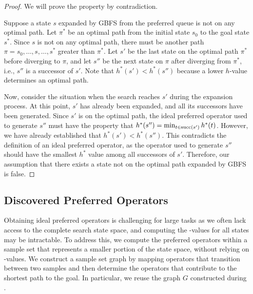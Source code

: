\documentclass[ppgc,diss,english]{iiufrgs}
\begin{document}
\begin{proof}
We will prove the property by contradiction.

Suppose a state $s$ expanded by GBFS from the preferred queue is not on any optimal path.
Let $\pi^*$ be an optimal path from the initial state $s_0$ to the goal state $s^*$. Since $s$ is not on any optimal path, there must be another path $\pi = s_0,\ldots,s,\ldots,s^*$ greater than $\pi^*$.
Let $s'$ be the last state on the optimal path $\pi^*$ before diverging to $\pi$, and let $s''$ be the next state on $\pi$ after diverging from $\pi^*$, i.e., $s''$ is a successor of $s'$. Note that $h^*(s') < h^*(s'')$ because a lower $h$-value determines an optimal path.

Now, consider the situation when the search reaches $s'$ during the expansion process. At this point, $s'$ has already been expanded, and all its successors have been generated. Since $s'$ is on the optimal path, the ideal preferred operator used to generate $s''$ must have the property that $h^*(s'') = \min_{t \in \operatorname{succ}(s')} h^*{(t)}$. However, we have already established that $h^*(s') < h^*(s'')$. This contradicts the definition of an ideal preferred operator, as the operator used to generate $s''$ should have the smallest $h^*$ value among all successors of $s'$. Therefore, our assumption that there exists a state not on the optimal path expanded by GBFS is false.


\end{proof}

\subsection{Discovered Preferred Operators}
\label{sec:sample-discovered-po}
Obtaining ideal preferred operators is challenging for large tasks as we often lack access to the complete search state space, and computing the \hstar-values for all states may be intractable. To address this, we compute the preferred operators within a sample set that represents a smaller portion of the state space, without relying on \hstar-values. We construct a sample set graph by mapping operators that transition between two samples and then determine the operators that contribute to the shortest path to the goal. In particular, we reuse the graph $G$ constructed during \sui.
\end{document}
